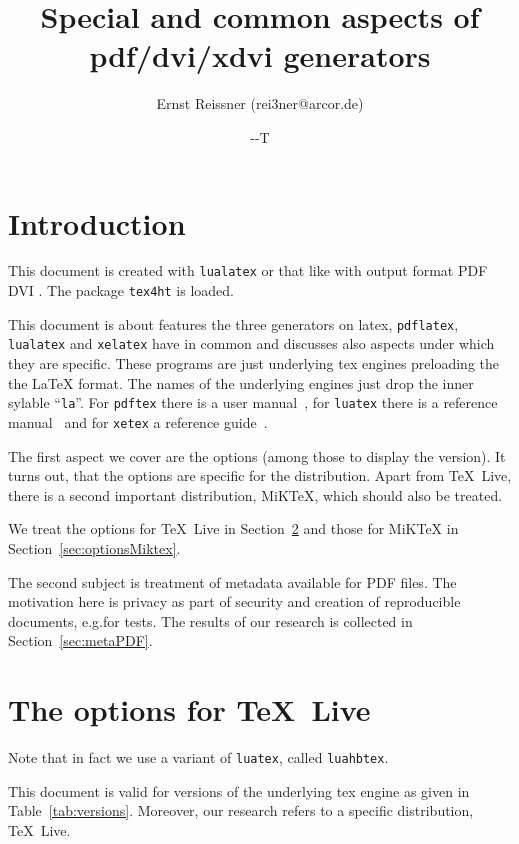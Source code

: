 \documentclass[a4paper, english]{article}%
\title{Special and common aspects of pdf/dvi/xdvi generators }
\author{Ernst Reissner (rei3ner@arcor.de)}
\date{\the\year-\the\month-\the\day T\printtime}%
\newcommand{\pdflatex}{\texttt{pdflatex}}
\newcommand{\lualatex}{\texttt{lualatex}}
\newcommand{\xelatex}{\texttt{xelatex}}
\newcommand{\texlive}{\TeX~Live}
\newcommand{\miktex}{MiKTeX}
\begin{document}
\maketitle
\tableofcontents
\listoftables
\lstlistoflistings%

\section{Introduction}

This document is created with \lualatex{} or that like 
with output format 
\ifpdf%
PDF%
\else
DVI%
\fi.
The package \texttt{tex4ht} 
is  loaded. 

This document is about features the three generators on latex, 
\pdflatex, \lualatex{} and \xelatex{} have in common 
and discusses also aspects under which they are specific. 
These programs are just underlying tex engines preloading the the \LaTeX{} format. 
The names of the underlying engines just drop the inner sylable ``\texttt{la}''. 
For \texttt{pdftex} there is a user manual~\cite{PdfTexUsr24}, 
for \texttt{luatex} there is a reference manual~\cite{LuaTexRef24} and 
for \texttt{xetex} a reference guide~\cite{XeTexRef24}. 

The first aspect we cover are the options (among those to display the version). 
It turns out, that the options are specific for the distribution. 
Apart from \texlive{}, there is a second important distribution, \miktex, 
which should also be treated. 

We treat the options for \texlive{} in Section~\ref{sec:optionsTexlive} 
and those for \miktex{} in Section~\ref{sec:optionsMiktex}. 

The second subject is treatment of metadata available for PDF files. 
The motivation here is privacy as part of security 
and creation of reproducible documents, e.g.\@ for tests. 
The results of our research is collected in Section~\ref{sec:metaPDF}. 

\section{The options for \texlive}\label{sec:optionsTexlive}


Note that in fact we use a variant of \texttt{luatex}, called \texttt{luahbtex}. 

This document is valid for versions of the underlying tex engine 
as given in Table~\ref{tab:versions}. 
Moreover, our research refers to a specific distribution, \texlive. 
\end{document}
